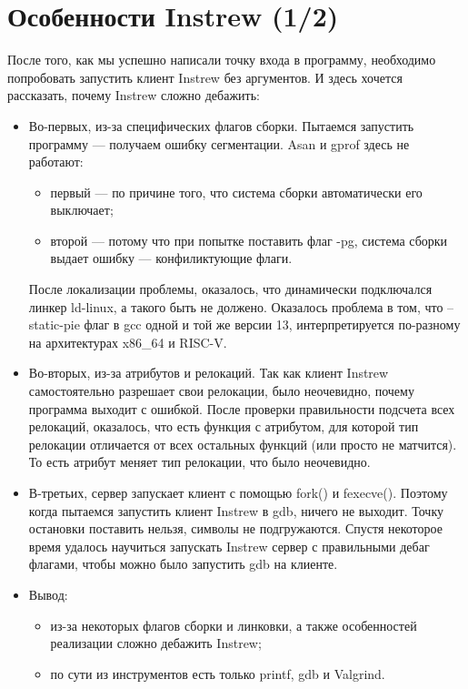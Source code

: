 \section{Особенности Instrew (1/2)}
После того, как мы успешно написали точку входа в программу, необходимо попробовать запустить клиент Instrew без аргументов. И здесь хочется рассказать, почему Instrew сложно дебажить:
\begin{itemize}
    \item Во-первых, из-за специфических флагов сборки. Пытаемся запустить программу --- получаем ошибку сегментации. Asan и gprof здесь не работают:
    \begin{itemize} 
	\item первый --- по причине того, что система сборки автоматически его выключает;
	\item второй --- потому что при попытке поставить флаг -pg, система сборки выдает ошибку --- конфиликтующие флаги.
    \end{itemize}
    После локализации проблемы, оказалось, что динамически подключался линкер ld-linux, а такого быть не должено. Оказалось проблема в том, что --static-pie флаг в gcc одной и той же версии 13, интерпретируется по-разному на архитектурах x86\_64 и RISC-V.
    \item Во-вторых, из-за атрибутов и релокаций. Так как клиент Instrew самостоятельно разрешает свои релокации, было неочевидно, почему программа выходит с ошибкой. После проверки правильности подсчета всех релокаций, оказалось, что есть функция с атрибутом, для которой тип релокации отличается от всех остальных функций (или просто не матчится). То есть атрибут меняет тип релокации, что было неочевидно.
    \item В-третьих, сервер запускает клиент с помощью fork() и fexecve(). Поэтому когда пытаемся запустить клиент Instrew в gdb, ничего не выходит. Точку остановки поставить нельзя, символы не подгружаются. Спустя некоторое время удалось научиться запускать Instrew сервер с правильными дебаг флагами, чтобы можно было запустить gdb на клиенте.
    \item Вывод:
	\begin{itemize}
	    \item из-за некоторых флагов сборки и линковки, а также особенностей реализации сложно дебажить Instrew;
	    \item по сути из инструментов есть только printf, gdb и Valgrind.
	\end{itemize}

\end{itemize}

